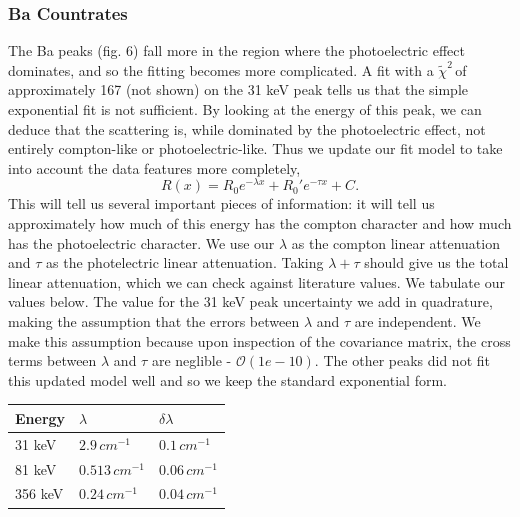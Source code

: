 \documentclass{article}
\newcommand{\redchi}{$\tilde{\chi}^2\,$}
\begin{document}
	\hspace{1cm}
	\subsubsection{Ba Countrates}

	The Ba peaks (fig. 6) fall more in the region where the photoelectric effect dominates, and so the fitting becomes more complicated.  A fit with a \redchi of approximately 167 (not shown) on the 31 keV peak tells us that the simple exponential fit is not sufficient.  By looking at the energy of this peak, we can deduce that the scattering is, while dominated by the photoelectric effect, not entirely compton-like or photoelectric-like.  Thus we update our fit model to take into account the data features more completely,
	\begin{equation}
		R(x) = R_0e^{-\lambda x} + R_0'e^{-\tau x} + C.
	\end{equation}
	This will tell us several important pieces of information: it will tell us approximately how much of this energy has the compton character and how much has the photoelectric character.  We use our $\lambda$ as the compton linear attenuation and $\tau$ as the photelectric linear attenuation.  Taking $\lambda + \tau$ should give us the total linear attenuation, which we can check against literature values.  We tabulate our values below.  The value for the 31 keV peak uncertainty we add in quadrature, making the assumption that the errors between $\lambda$ and $\tau$ are independent.  We make this assumption because upon inspection of the covariance matrix, the cross terms between $\lambda$ and $\tau$ are neglible - $\mathcal{O}(1e-10)$.  The other peaks did not fit this updated model well and so we keep the standard exponential form.

	\begin{center}
	\begin{tabular}{|l|l|l|}
		\hline
		Energy & $\lambda$ & $\delta \lambda$\\ \hline
		31 keV & $2.9 \, cm^{-1}$ & $0.1 \, cm^{-1}$\\
		81 keV & $0.513  \, cm^{-1}$ & $0.06 \, cm^{-1}$\\
		356 keV & $0.24 \, cm^{-1}$ & $0.04 \, cm^{-1}$\\
		\hline
	\end{tabular}
	\end{center}
\end{document}
